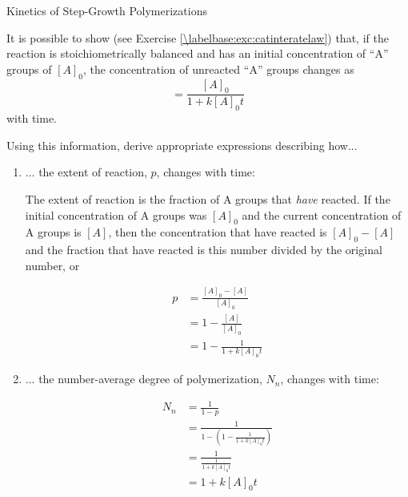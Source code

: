 \begin{activity}{Kinetics of Step-Growth Polymerizations}
\begin{infobox}
	It is possible to show (see Exercise \ref{\labelbase:exc:catinteratelaw}) that, if the reaction is stoichiometrically balanced and has an initial concentration of ``A'' groups of $[A]_0$, the concentration of unreacted ``A'' groups changes as
	\begin{equation*}
		[A] = \frac{[A]_0}{1 + k[A]_0 t}
	\end{equation*}	
	with time.
	\label{\labelbase:infobox:catintegrated}
\end{infobox}

\begin{ctqs}

	\question Using this information, derive appropriate expressions describing how...
	
		\begin{enumerate}
			\item ... the extent of reaction, $p$, changes with time:
			
				\begin{solution}[2.5in]
					The extent of reaction is the fraction of A groups that \emph{have} reacted.  If the initial concentration of A groups was $[A]_0$ and the current concentration of A groups is $[A]$, then the concentration that have reacted is $[A]_0 - [A]$ and the fraction that have reacted is this number divided by the original number, or
					
					\begin{align*}
						p &= \frac{[A]_0-[A]}{[A]_0} \\
						  &= 1 - \frac{[A]}{[A]_0}\\
						  &= 1- \frac{1}{1 + k[A]_0 t}
					\end{align*}
				\end{solution}
			
			\item ... the number-average degree of polymerization, $N_n$, changes with time: \label{\labelbase:ctq:catNn}
			
				\begin{solution}[2in]
					\begin{align*}
						N_n &= \frac{1}{1-p}\\
							&= \frac{1}{1-\left(1- \frac{1}{1 + k[A]_0 t}\right)}\\
							&= \frac{1}{\frac{1}{1 + k[A]_0 t}}\\
							&= 1 + k[A]_0 t
					\end{align*}
				\end{solution}
			

\end{enumerate}
\end{ctqs}
\end{activity}
